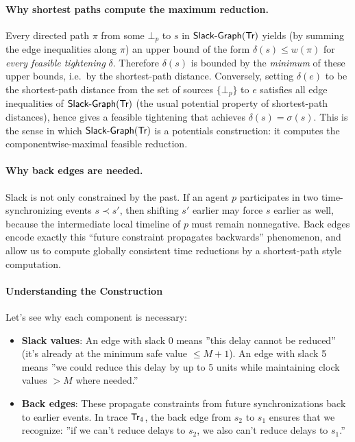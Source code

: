 \paragraph*{Why shortest paths compute the maximum reduction.}
Every directed path $\pi$ from some $\bot_p$ to $s$ in $\mathrm{\textsf{Slack-Graph}}(\textsf{Tr})$ yields (by summing the edge inequalities along $\pi$)
an upper bound of the form $\delta(s)\le w(\pi)$ for \emph{every feasible tightening} $\delta$.
Therefore $\delta(s)$ is bounded by the \emph{minimum} of these upper bounds, i.e.\ by the shortest-path distance.
Conversely, setting $\delta(e)$ to be the shortest-path distance from the set of sources $\{\bot_p\}$ to $e$
satisfies all edge inequalities of $\mathrm{\textsf{Slack-Graph}}(\textsf{Tr})$ (the usual potential property of shortest-path distances),
hence gives a feasible tightening that achieves $\delta(s)=\sigma(s)$.
This is the sense in which $\mathrm{\textsf{Slack-Graph}}(\textsf{Tr})$ is a potentials construction: it computes the componentwise-maximal feasible reduction.

\paragraph*{Why back edges are needed.}
Slack is not only constrained by the past. If an agent $p$ participates in two time-synchronizing events $s \prec s'$, then shifting $s'$ earlier may force $s$ earlier as well, because the intermediate local timeline of $p$ must remain nonnegative. Back edges encode exactly this ``future constraint propagates backwards'' phenomenon, and allow us to compute globally consistent time reductions by a shortest-path style computation.

\paragraph*{Understanding the Construction}

Let's see why each component is necessary:

\begin{itemize}
\item \textbf{Slack values}: An edge with slack 0 means ''this delay cannot be reduced'' (it's already at the minimum safe value $\leq M+1$). An edge with slack 5 means ''we could reduce this delay by up to 5 units while maintaining clock values $> M$ where needed.''

\item \textbf{Back edges}: These propagate constraints from future synchronizations back to earlier events. In trace $\textsf{Tr}_4$, the back edge from $s_2$ to $s_1$ ensures that we recognize: ''if we can't reduce delays to $s_2$, we also can't reduce delays to $s_1$.''
\end{itemize}

